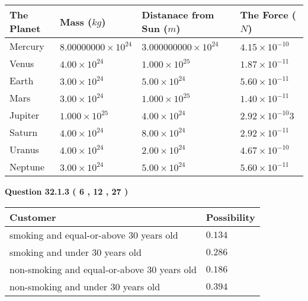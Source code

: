 \documentclass[12pt]{article}
\begin{document}
 
\begin{tabular}{|l|l|l|l|}
\hline
The Planet & Mass ($kg$) & Distanace from Sun ($m$) & The Force ($N$)\\
\hline
Mercury  &
           $ %
8.00000000 \times 10^{24}  $   &
             $ %
3.000000000 \times 10^{24}$    & $ %
4.15 \times 10^{-10} $
\\  \hline
Venus    &
           $  %
4.00 \times 10^{24}  $     &
             $ %
1.000 \times 10^{25} $    & $ %
1.87 \times 10^{-11} $
\\  \hline
Earth    &
           $  %
3.00 \times 10^{24}$     &
             $ %
5.00 \times 10^{24} $    & $ %
5.60 \times 10^{-11} $
\\   \hline
Mars     &
           $  %
3.00 \times 10^{24} $     &
             $ %
1.000 \times 10^{25}$    & $ %
1.40 \times 10^{-11} $
\\   \hline
Jupiter  &
           $  %
1.000 \times 10^{25}  $    &
             $ %
4.00 \times 10^{24} $    & $ %
2.92 \times 10^{-10}3 $
\\  \hline
Saturn   &
           $  %
4.00 \times 10^{24}   $    &
             $ %
8.00 \times 10^{24}  $    & $ %
2.92 \times 10^{-11} $
\\  \hline
Uranus   &
           $  %
4.00 \times 10^{24} $    &
             $ %
2.00 \times 10^{24}$    & $ %
4.67 \times 10^{-10} $
\\  \hline
Neptune  &
           $  %
3.00 \times 10^{24}  $    &
             $ %
5.00 \times 10^{24} $    & $ %
5.60 \times 10^{-11} $
\\  \hline
 
\end{tabular}
 
 
  
  
{\textbf{\large{Question
32.1.3 
 (           6 ,          12 ,          27 )
}}}

 
\noindent
\begin{tabular}{|l|l|}
\hline
Customer & Possibility \\
\hline
smoking  and  %
equal-or-above 30 years old &
  $ %
0.134$ \\
\hline
smoking  and  %
under 30 years old &
  $ %
0.286$ \\
\hline
 non-smoking and  %
equal-or-above 30 years old &
  $ %
0.186$ \\
\hline
 non-smoking and  %
under 30 years old &
  $ %
0.394$ \\
\hline
\end{tabular}
 
\end{document}
